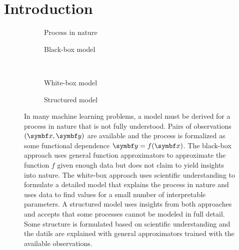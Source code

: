 \chapter{Introduction}
\label{toc:introduction}
\begin{figure}[tp]
    \begin{subfigure}[b]{\halffigurewidth}
        \centering
        \caption{
            \label{fig:introduction:models:nature}
            Process in nature
        }
    \end{subfigure}
    \hfill
    \begin{subfigure}[b]{\halffigurewidth}
        \centering
        \caption{
            \label{fig:introduction:models:black_box}
            Black-box model
        }
    \end{subfigure}\\[\figureskip]
    \begin{subfigure}[b]{\halffigurewidth}
        \centering
        \caption{
            \label{fig:introduction:models:white_box}
            White-box model
        }
    \end{subfigure}
    \hfill
    \begin{subfigure}[b]{\halffigurewidth}
        \centering
        \caption{
            \label{fig:introduction:models:structured}
            Structured model
        }
    \end{subfigure}
    \caption[Comparison of model cultures]{
        \label{fig:introduction:models}
        In many machine learning problems, a model must be derived for a process in nature that is not fully understood.
        Pairs of observations $(\mat{x}, \mat{y})$ are available and the process is formalized as some functional dependence $\mat{y} = f(\mat{x})$.
        The black-box approach uses general function approximators to approximate the function $f$ given enough data but does not claim to yield insights into nature.
        The white-box approach uses scientific understanding to formulate a detailed model that explains the process in nature and uses data to find values for a small number of interpretable parameters.
        A structured model uses insights from both approaches and accepts that some processes cannot be modeled in full detail.
        Some structure is formulated based on scientific understanding and the datils are explained with general approximators trained with the available observations.
    }
\end{figure}
